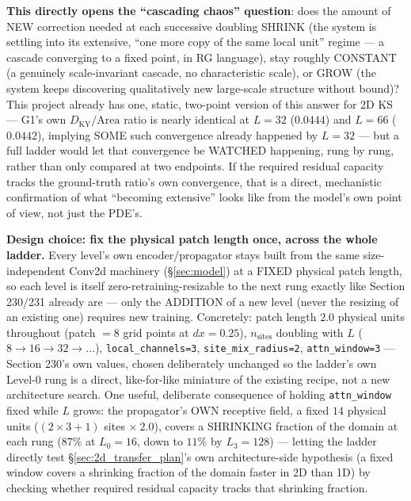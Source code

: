 \documentclass[11pt]{article}
\begin{document}
\textbf{This directly opens the ``cascading chaos'' question}: does the
amount of NEW correction needed at each successive doubling SHRINK
(the system is settling into its extensive, ``one more copy of the same
local unit'' regime --- a cascade converging to a fixed point, in RG
language), stay roughly CONSTANT (a genuinely scale-invariant cascade,
no characteristic scale), or GROW (the system keeps discovering
qualitatively new large-scale structure without bound)? This project
already has one, static, two-point version of this answer for 2D KS ---
G1's own $D_{\mathrm{KY}}/\mathrm{Area}$ ratio is nearly identical at
$L{=}32$ ($0.0444$) and $L{=}66$ ($0.0442$), implying SOME such
convergence already happened by $L{=}32$ --- but a full ladder would let
that convergence be WATCHED happening, rung by rung, rather than only
compared at two endpoints. If the required residual capacity tracks the
ground-truth ratio's own convergence, that is a direct, mechanistic
confirmation of what ``becoming extensive'' looks like from the model's
own point of view, not just the PDE's.

\textbf{Design choice: fix the physical patch length once, across the
whole ladder.} Every level's own encoder/propagator stays built from the
same size-independent Conv2d machinery (\S\ref{sec:model}) at a FIXED
physical patch length, so each level is itself zero-retraining-resizable
to the next rung exactly like Section 230/231 already are --- only the
ADDITION of a new level (never the resizing of an existing one) requires
new training. Concretely: patch length $2.0$ physical units throughout
(patch $=8$ grid points at $dx{=}0.25$), $n_{\mathrm{sites}}$ doubling
with $L$ ($8\to16\to32\to\ldots$), \texttt{local\_channels=3},
\texttt{site\_mix\_radius=2}, \texttt{attn\_window=3} --- Section 230's
own values, chosen deliberately unchanged so the ladder's own Level-0
rung is a direct, like-for-like miniature of the existing recipe, not a
new architecture search. One useful, deliberate consequence of holding
\texttt{attn\_window} fixed while $L$ grows: the propagator's OWN
receptive field, a fixed $14$ physical units
($(2\times3{+}1)$ sites $\times\ 2.0$), covers a SHRINKING fraction of
the domain at each rung ($87\%$ at $L_0{=}16$, down to $11\%$ by
$L_3{=}128$) --- letting the ladder directly test
\S\ref{sec:2d_transfer_plan}'s own architecture-side hypothesis (a fixed
window covers a shrinking fraction of the domain faster in 2D than 1D)
by checking whether required residual capacity tracks that shrinking
fraction.
\end{document}
